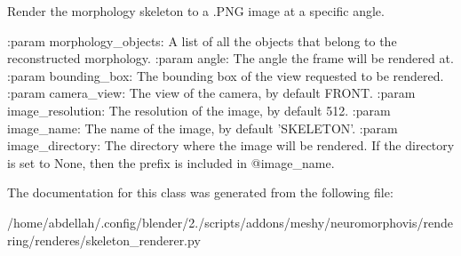 \begin{DoxyVerb}Render the morphology skeleton to a .PNG image at a specific angle.

:param morphology_objects:
    A list of all the objects that belong to the reconstructed morphology.
:param angle:
    The angle the frame will be rendered at.
:param bounding_box:
    The bounding box of the view requested to be rendered.
:param camera_view:
    The view of the camera, by default FRONT.
:param image_resolution:
    The resolution of the image, by default 512.
:param image_name:
    The name of the image, by default 'SKELETON'.
:param image_directory:
    The directory where the image will be rendered. If the directory is set to None,
    then the prefix is included in @image_name.
\end{DoxyVerb}
 

The documentation for this class was generated from the following file\+:\begin{DoxyCompactItemize}
\item 
/home/abdellah/.\+config/blender/2./scripts/addons/meshy/neuromorphovis/rendering/renderes/skeleton\+\_\+renderer.\+py\end{DoxyCompactItemize}
